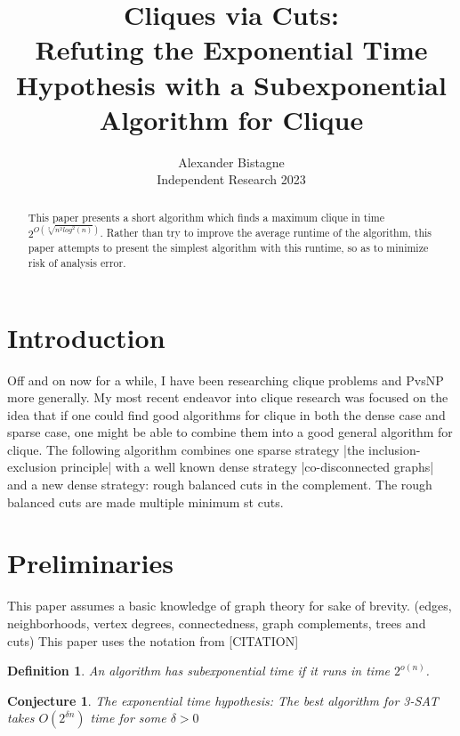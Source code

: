 \documentclass[12pt]{article}
\newtheorem{conj}[thm]{Conjecture}
\newtheorem{mydef}[thm]{Definition}
\begin{document}
\title{Cliques via Cuts: \\ Refuting the Exponential Time Hypothesis with a Subexponential Algorithm for Clique}

\author{Alexander Bistagne \\ 
Independent Research 2023}

\maketitle

\begin{abstract}
  This paper presents a short algorithm which finds a maximum clique in time $2^{ O(\sqrt[3]{n^2log^2(n)}) } $. Rather than try to improve the average runtime of the algorithm, this paper attempts to present the simplest algorithm with this runtime, so as to minimize risk of analysis error.

\end{abstract}


\section{Introduction}
Off and on now for a while, I have been researching clique problems and PvsNP more generally. My most recent endeavor into clique research was focused on the idea that if one could find good algorithms for clique in both the dense case and sparse case, one might be able to combine them into a good general algorithm for clique. The following algorithm combines one sparse strategy |the inclusion-exclusion principle| with a well known dense strategy |co-disconnected graphs| and a new dense strategy: rough balanced cuts in the complement. The rough balanced cuts are made multiple minimum st cuts.

\section{Preliminaries}

This paper assumes a basic knowledge of graph theory for sake of brevity. (edges, neighborhoods, vertex degrees, connectedness, graph complements, trees and cuts) This paper uses the notation from [CITATION]

\begin{mydef} An algorithm has subexponential time if it runs in time $2^{o(n)}$. \end{mydef}

\begin{conj}\cite[abstract and theorem 1]{IMPAGLIAZZO2000} The exponential time hypothesis: The best algorithm for 3-SAT takes $ O(2^{\delta n}) $ time for some $\delta > 0 $\end{conj}
\end{document}
